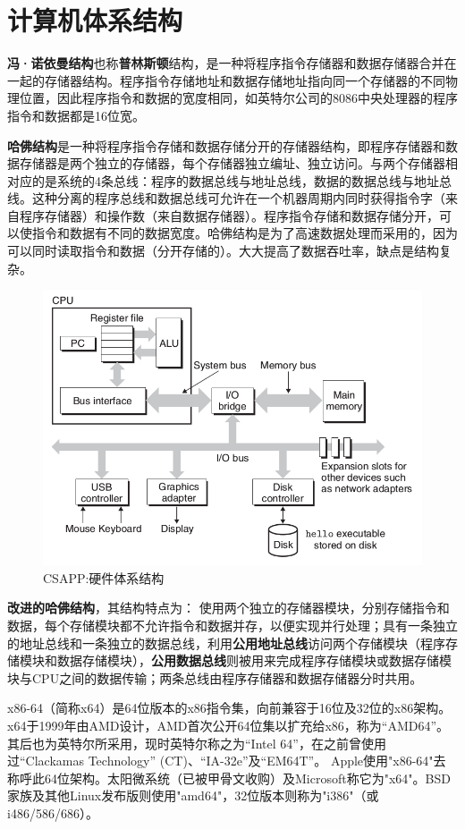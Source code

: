 \section{计算机体系结构}

\textbf{冯·诺依曼结构}也称\textbf{普林斯顿}结构，是一种将程序指令存储器和数据存储器合并在一起的存储器结构。程序指令存储地址和数据存储地址指向同一个存储器的不同物理位置，因此程序指令和数据的宽度相同，如英特尔公司的8086中央处理器的程序指令和数据都是16位宽。


\textbf{哈佛结构}是一种将程序指令存储和数据存储分开的存储器结构，即程序存储器和数据存储器是两个独立的存储器，每个存储器独立编址、独立访问。与两个存储器相对应的是系统的4条总线：程序的数据总线与地址总线，数据的数据总线与地址总线。这种分离的程序总线和数据总线可允许在一个机器周期内同时获得指令字（来自程序存储器）和操作数（来自数据存储器）。程序指令存储和数据存储分开，可以使指令和数据有不同的数据宽度。哈佛结构是为了高速数据处理而采用的，因为可以同时读取指令和数据（分开存储的）。大大提高了数据吞吐率，缺点是结构复杂。


\begin{figure}[ht]
	\begin{center}
	\includegraphics[keepaspectratio,width=0.3\paperwidth]{Pictures/sysBusCsapp.png}
		\caption{CSAPP:硬件体系结构}
	\label{fig:HardwareStructure}
	\end{center}
\end{figure}

\textbf{改进的哈佛结构}，其结构特点为：
使用两个独立的存储器模块，分别存储指令和数据，每个存储模块都不允许指令和数据并存，以便实现并行处理；具有一条独立的地址总线和一条独立的数据总线，利用\textbf{公用地址总线}访问两个存储模块（程序存储模块和数据存储模块），\textbf{公用数据总线}则被用来完成程序存储模块或数据存储模块与CPU之间的数据传输；两条总线由程序存储器和数据存储器分时共用。

x86-64（简称x64）是64位版本的x86指令集，向前兼容于16位及32位的x86架构。x64于1999年由AMD设计，AMD首次公开64位集以扩充给x86，称为“AMD64”。其后也为英特尔所采用，现时英特尔称之为“Intel 64”，在之前曾使用过“Clackamas Technology” (CT)、“IA-32e”及“EM64T”。
Apple使用"x86-64"去称呼此64位架构。太阳微系统（已被甲骨文收购）及Microsoft称它为"x64"。BSD家族及其他Linux发布版则使用"amd64"，32位版本则称为"i386"（或i486/586/686）。

\clearpage